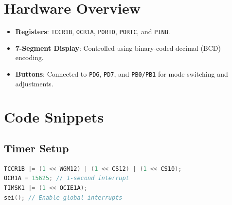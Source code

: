 \documentclass[journal]{IEEEtran}
\begin{document}
\section*{Hardware Overview}
\begin{itemize}
    \item \textbf{Registers}: \texttt{TCCR1B}, \texttt{OCR1A}, \texttt{PORTD}, \texttt{PORTC}, and \texttt{PINB}.
    \item \textbf{7-Segment Display}: Controlled using binary-coded decimal (BCD) encoding.
    \item \textbf{Buttons}: Connected to \texttt{PD6}, \texttt{PD7}, and \texttt{PB0/PB1} for mode switching and adjustments.
\end{itemize}

\section*{Code Snippets}
\subsection*{Timer Setup}
\begin{lstlisting}[language=C, frame=single, basicstyle=\ttfamily\small, keywordstyle=\color{blue}]
TCCR1B |= (1 << WGM12) | (1 << CS12) | (1 << CS10);
OCR1A = 15625; // 1-second interrupt
TIMSK1 |= (1 << OCIE1A);
sei(); // Enable global interrupts
\end{lstlisting}
\end{document}
